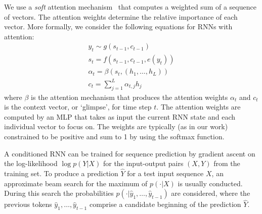\documentclass{article} %
\begin{document}
We use a \emph{soft} attention mechanism~\citep{bahdanau2015neural} that computes a weighted sum
of a sequence of vectors. The attention weights
determine the relative importance of each vector.
More formally, we consider the following equations for RNNs with attention:
\begin{align}
    y_t \sim g(s_{t-1}, c_{t-1}) \\ 
    s_t = f(s_{t-1}, c_{t-1}, e(y_t)) \\
    \alpha_t = \beta(s_t, (h_{1},\ldots,h_{L})) \\
    c_t = \sum\limits_{j=1}^L \alpha_{t,j} h_j
\end{align}   
where $\beta$ is the attention mechanism that produces the attention weights
$\alpha_t$ and $c_t$ is the context vector, or `glimpse', for time step $t$.
The attention weights are computed by an MLP that takes as input the current RNN
state and each individual vector to focus on. The weights are typically (as in
our work) constrained to be positive and sum to 1 by using the softmax function.

A conditioned RNN can be trained for sequence prediction by gradient ascent on
the log-likelihood $\log p(Y|X)$ for the input-output pairs $(X, Y)$ from the
training set. To produce a prediction $\hat{Y}$ for a test input sequence $X$, an approximate
beam search for the maximum of $p(\cdot|X)$ is usually conducted. During this
search the probabilities $p(\cdot|\hat{y}_1, \ldots, \hat{y}_{t-1})$ are considered,
where the previous tokens $\hat{y}_1, \ldots, \hat{y}_{t-1}$ comprise a candidate
beginning of the prediction $\hat{Y}$. 

\end{document}

